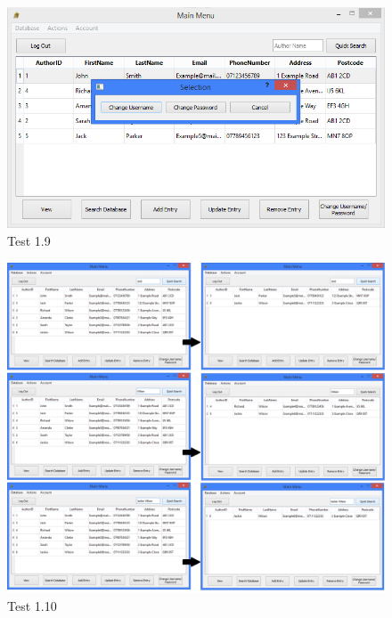 \begin{landscape}
\begin{figure}[H]
    \includegraphics[width=\textwidth]{./Testing/Evidence/ChangeButtonTest.png}
    \caption{Test 1.9}  \label{fig:ChangeButtonTest}
\end{figure}

\begin{figure}[H]
    \includegraphics[width=\textwidth]{./Testing/Evidence/QuickSearchButtonTest.png}
    \caption{Test 1.10}  \label{fig:QuickSearchButtonTest}
\end{figure}


\end{landscape}
